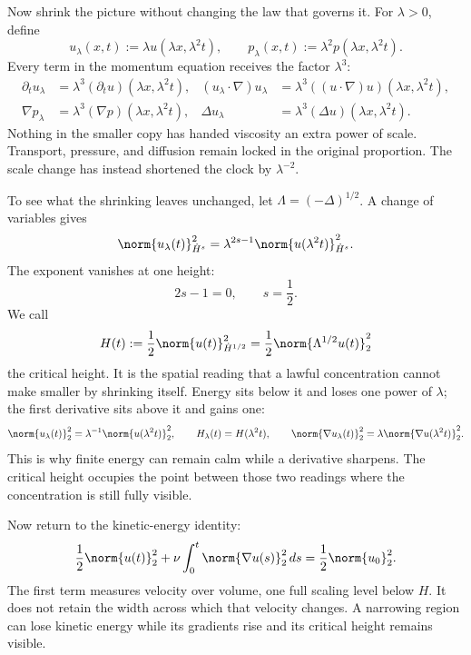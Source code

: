 Now shrink the picture without changing the law that governs it.  For
\(\lambda>0\), define
\begin{equation}\label{eq:BodyNavierStokesScaling}
  u_\lambda(x,t):=\lambda u(\lambda x,\lambda^2t),
  \qquad
  p_\lambda(x,t):=\lambda^2p(\lambda x,\lambda^2t).
\end{equation}
Every term in the momentum equation receives the factor \(\lambda^3\):
\[
\begin{aligned}
  \partial_tu_\lambda
  &=\lambda^3(\partial_tu)(\lambda x,\lambda^2t),
  &
  (u_\lambda\cdot\nabla)u_\lambda
  &=\lambda^3((u\cdot\nabla)u)(\lambda x,\lambda^2t),
  \\
  \nabla p_\lambda
  &=\lambda^3(\nabla p)(\lambda x,\lambda^2t),
  &
  \Delta u_\lambda
  &=\lambda^3(\Delta u)(\lambda x,\lambda^2t).
\end{aligned}
\]
Nothing in the smaller copy has handed viscosity an extra power of scale.
Transport, pressure, and diffusion remain locked in the original proportion.
The scale change has instead shortened the clock by \(\lambda^{-2}\).

To see what the shrinking leaves unchanged, let
\(\Lambda=(-\Delta)^{1/2}\).  A change of variables gives
\begin{equation}\label{eq:BodyHomogeneousSobolevScaling}
  \norm{u_\lambda(t)}_{\dot H^s}^2
  =\lambda^{2s-1}\norm{u(\lambda^2t)}_{\dot H^s}^2.
\end{equation}
The exponent vanishes at one height:
\[
  2s-1=0,
  \qquad
  s=\frac12.
\]
We call
\begin{equation}\label{eq:BodyCriticalHeightDefinition}
  H(t):=\frac12\norm{u(t)}_{\dot H^{1/2}}^2
  =\frac12\norm{\Lambda^{1/2}u(t)}_2^2
\end{equation}
the critical height.  It is the spatial reading that a lawful concentration
cannot make smaller by shrinking itself.  Energy sits below it and loses one
power of \(\lambda\); the first derivative sits above it and gains one:
\[
  \norm{u_\lambda(t)}_2^2
  =\lambda^{-1}\norm{u(\lambda^2t)}_2^2,
  \qquad
  H_\lambda(t)=H(\lambda^2t),
  \qquad
  \norm{\nabla u_\lambda(t)}_2^2
  =\lambda\norm{\nabla u(\lambda^2t)}_2^2.
\]
This is why finite energy can remain calm while a derivative sharpens.  The
critical height occupies the point between those two readings where the
concentration is still fully visible.

Now return to the kinetic-energy identity:
\begin{equation}\label{eq:BodyEnergyIdentity}
  \frac12\norm{u(t)}_2^2
  +\nu\int_0^t\norm{\nabla u(s)}_2^2\,ds
  =\frac12\norm{u_0}_2^2.
\end{equation}
The first term measures velocity over volume, one full scaling level below
\(H\).  It does not retain the width across which that velocity changes.  A
narrowing region can lose kinetic energy while its gradients rise and its
critical height remains visible.

